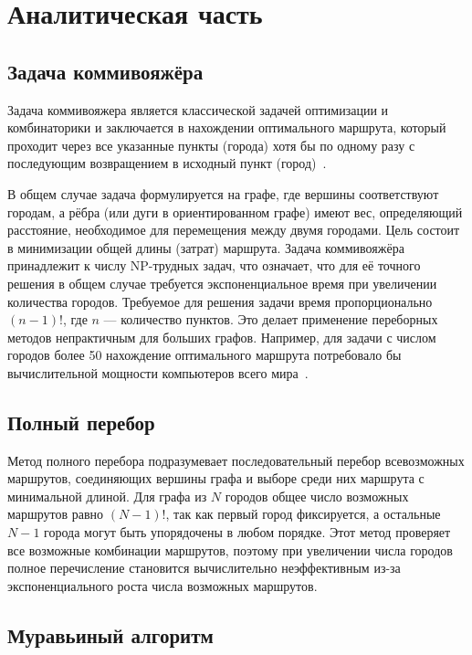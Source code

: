 \chapter{Аналитическая часть}

\section{Задача коммивояжёра}

Задача коммивояжера является классической задачей оптимизации и комбинаторики и заключается в нахождении оптимального маршрута, который проходит через все указанные пункты (города) хотя бы по одному разу с последующим возвращением в исходный пункт (город)~\cite{lit1}.

В общем случае задача формулируется на графе, где вершины соответствуют городам, а рёбра (или дуги в ориентированном графе) имеют вес, определяющий расстояние, необходимое для перемещения между двумя городами. Цель состоит в минимизации общей длины (затрат) маршрута.
Задача коммивояжёра принадлежит к числу NP-трудных задач, что означает, что для её точного решения в общем случае требуется экспоненциальное время при увеличении количества городов. Требуемое для решения задачи время пропорционально \((n-1)!\), где \(n\) — количество пунктов. Это делает применение переборных методов непрактичным для больших графов. Например, для задачи с числом городов более 50 нахождение оптимального маршрута потребовало бы вычислительной мощности компьютеров всего мира~\cite{lit1}.

\section{Полный перебор}

Метод полного перебора подразумевает последовательный перебор всевозможных маршрутов, соединяющих вершины графа и выборе среди них маршрута с минимальной длиной. Для графа из \(N\) городов общее число возможных маршрутов равно \((N-1)!\), так как первый город фиксируется, а остальные \(N-1\) города могут быть упорядочены в любом порядке. 
Этот метод проверяет все возможные комбинации маршрутов, поэтому при увеличении числа городов полное перечисление становится вычислительно неэффективным из-за экспоненциального роста числа возможных маршрутов. 

\section{Муравьиный алгоритм}

